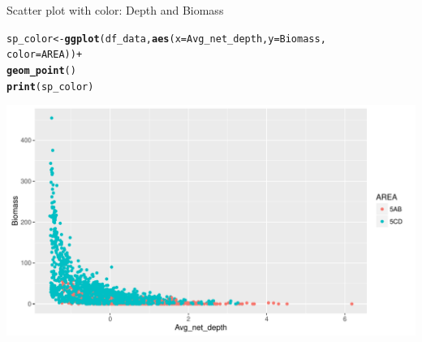 \documentclass{beamer}\usepackage[]{graphicx}\usepackage[]{color}
\makeatletter
\newcommand{\hlopt}[1]{\textcolor[rgb]{0,0,0}{#1}}%
\newcommand{\hlstd}[1]{\textcolor[rgb]{0.345,0.345,0.345}{#1}}%
\newcommand{\hlkwb}[1]{\textcolor[rgb]{0.69,0.353,0.396}{#1}}%
\newcommand{\hlkwc}[1]{\textcolor[rgb]{0.333,0.667,0.333}{#1}}%
\newcommand{\hlkwd}[1]{\textcolor[rgb]{0.737,0.353,0.396}{\textbf{#1}}}%
\newenvironment{kframe}{%
 \def\at@end@of@kframe{}%
 \ifinner\ifhmode%
  \def\at@end@of@kframe{\end{minipage}}%
  \begin{minipage}{\columnwidth}%
 \fi\fi%
 \def\FrameCommand##1{\hskip\@totalleftmargin \hskip-\fboxsep
 \colorbox{shadecolor}{##1}\hskip-\fboxsep
     \hskip-\linewidth \hskip-\@totalleftmargin \hskip\columnwidth}%
 \MakeFramed {\advance\hsize-\width
   \@totalleftmargin\z@ \linewidth\hsize
   \@setminipage}}%
 {\par\unskip\endMakeFramed%
 \at@end@of@kframe}
\newenvironment{knitrout}{}{} %
\makeatother
\begin{document}
\begin{frame}[fragile]{Scatter plot with color: Depth and Biomass}
\begin{knitrout}\footnotesize
{}\color{fgcolor}\begin{kframe}
\begin{alltt}
\hlstd{sp_color} \hlkwb{<-} \hlkwd{ggplot}\hlstd{(df_data,} \hlkwd{aes}\hlstd{(}\hlkwc{x}\hlstd{=Avg_net_depth,} \hlkwc{y}\hlstd{=Biomass,}
                                \hlkwc{color}\hlstd{=AREA))} \hlopt{+}
  \hlkwd{geom_point}\hlstd{()}
\hlkwd{print}\hlstd{(sp_color)}
\end{alltt}
\end{kframe}

{\centering \includegraphics[width=.9\linewidth]{figure/scatter_plot_color-1} 

}



\end{knitrout}
\end{frame}
\end{document}
